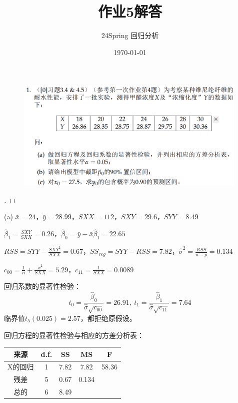 \documentclass[cn,hazy,green,12pt,normal]{elegantnote}
\title{作业5解答}
\author{24Spring 回归分析}
\date{\today}
\numberwithin{equation}{section}
\numberwithin{subsection}{section}
\begin{document}
\maketitle

\begin{homework}   
\end{homework}
\begin{figure}[!htbp]
    \centering
    \includegraphics[width=30em]{image/hw5_1.png}
\end{figure}

\begin{proof}[\solutionname]
\end{proof}

(a) $\bar{x}=24$，$\bar{y}=28.99$，$SXX=112$，$SXY=29.6$，$SYY=8.49$

$\hat{\beta}_1 = \frac{SXY}{SXX} = 0.26$，$\hat{\beta}_0 = \bar{y} - \bar{x} \hat{\beta}_1 = 22.65$

$RSS = SYY-\frac{SXY^2}{SXX} = 0.67$，$SS_{reg} = SYY-RSS = 7.82$，$\hat{\sigma}^2 = \frac{RSS}{n-p} = 0.134$

$c_{00} = \frac{1}{n} + \frac{\bar{x}^2}{SXX} = 5.29$，$c_{11} = \frac{1}{SXX} = 0.0089$

回归系数的显著性检验：
$$
t_0 = \frac{\hat{\beta}_0}{\hat{\sigma} \sqrt{c_{00}}} = 26.91, \ t_1 = \frac{\hat{\beta}_1}{\hat{\sigma} \sqrt{c_{11}}} = 7.64
$$
临界值$t_5(0.025) = 2.57$，都拒绝原假设。

回归方程的显著性检验与相应的方差分析表：

\begin{center}
\begin{tabular}{|c|c|c|c|c|}
  \hline
  来源 & d.f. & SS & MS & F \\
  \hline
  X的回归 & 1 & 7.82 & 7.82 & 58.36 \\
  \hline
  残差 & 5 & 0.67 & 0.134 & {} \\
  \hline
  总的 & 6 & 8.49 & {} & {} \\
  \hline
\end{tabular}
\end{center}
\end{document}
